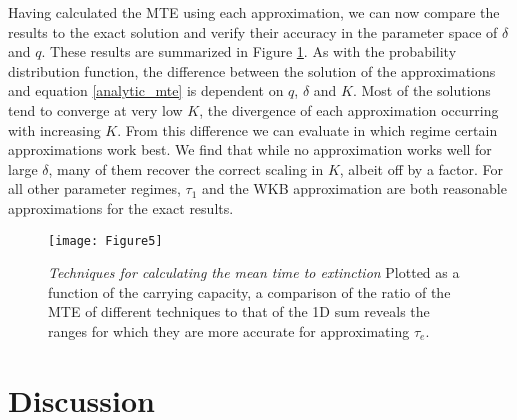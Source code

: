 \documentclass[a4paper,10pt]{article}
\numberwithin{equation}{section} %
\begin{document}
Having calculated the MTE using each approximation, we can now compare the results to the exact solution and verify their accuracy in the parameter space of $\delta$ and $q$.
These results are summarized in Figure \ref{mte_techn}.
As with the probability distribution function, the difference between the solution of the approximations and equation \ref{analytic_mte} is dependent on $q$, $\delta$ and $K$. 
Most of the solutions tend to converge at very low $K$, the divergence of each approximation occurring with increasing $K$. 
From this difference we can evaluate in which regime certain approximations work best.
We find that while no approximation works well for large $\delta$, many of them recover the correct scaling in $K$, albeit off by a factor. %
For all other parameter regimes, $\tau_1$ and the WKB approximation are both reasonable approximations for the exact results. %

\begin{figure}[ht!]
\centering
\texttt{[image: Figure5]}
\caption{\emph{Techniques for calculating the mean time to extinction} Plotted as a function of the carrying capacity, a comparison of the ratio of the MTE of different techniques to that of the 1D sum reveals the ranges for which they are more accurate for approximating $\tau_{e}$.} \label{mte_techn}
\end{figure}








\section{Discussion}
\end{document}
